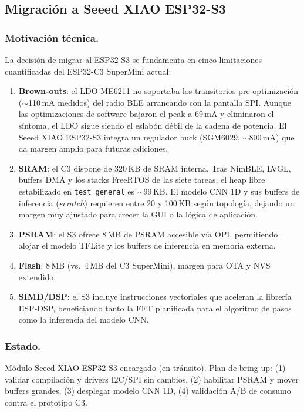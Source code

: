 \documentclass[letterpaper,11pt]{article}
\begin{document}
\subsection{Migración a Seeed XIAO ESP32-S3}
\label{sec:s3}
\subsubsection{Motivación técnica.} La decisión de migrar al ESP32-S3 se fundamenta en cinco
limitaciones cuantificadas del ESP32-C3 SuperMini actual:
\begin{enumerate}
    \item \textbf{Brown-outs}: el LDO ME6211 no soportaba los transitorios pre-optimización
    ($\sim$110\,mA medidos) del radio BLE arrancando con la pantalla SPI\@. Aunque las
    optimizaciones de software bajaron el peak a 69\,mA y eliminaron el síntoma, el LDO
    sigue siendo el eslabón débil de la cadena de potencia. El Seeed XIAO ESP32-S3 integra
    un regulador buck (SGM6029, $\sim$800\,mA) que da margen amplio para futuras adiciones.
    \item \textbf{SRAM}: el C3 dispone de 320\,KB de SRAM interna. Tras NimBLE, LVGL, buffers
    DMA y los stacks FreeRTOS de las siete tareas, el heap libre estabilizado en
    \texttt{test\_general} es $\sim$99\,KB. El modelo CNN 1D y sus buffers de inferencia
    (\textit{scratch}) requieren entre 20 y 100\,KB según topología, dejando un margen muy
    ajustado para crecer la GUI o la lógica de aplicación.
    \item \textbf{PSRAM}: el S3 ofrece 8\,MB de PSRAM accesible vía OPI, permitiendo alojar el
    modelo TFLite y los buffers de inferencia en memoria externa.
    \item \textbf{Flash}: 8\,MB (vs.\ 4\,MB del C3 SuperMini), margen para OTA y NVS extendido.
    \item \textbf{SIMD/DSP}: el S3 incluye instrucciones vectoriales que aceleran la librería
    ESP-DSP, beneficiando tanto la FFT planificada para el algoritmo de pasos como la
    inferencia del modelo CNN.
\end{enumerate}

\subsubsection{Estado.} Módulo Seeed XIAO ESP32-S3 encargado (en tránsito). Plan de bring-up:
(1) validar compilación y drivers I2C/SPI sin cambios, (2) habilitar PSRAM y mover buffers
grandes, (3) desplegar modelo CNN 1D, (4) validación A/B de consumo contra el prototipo C3.
\end{document}
